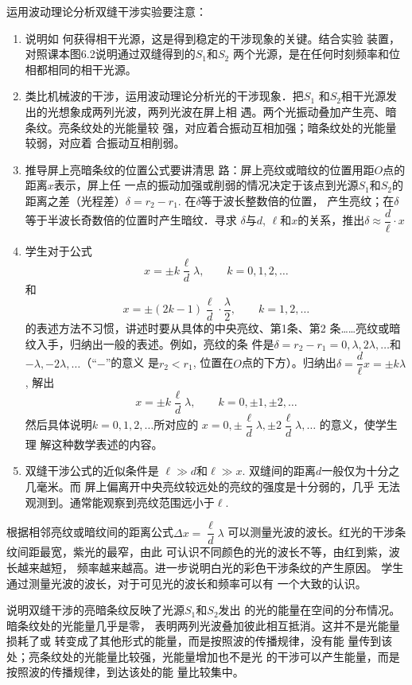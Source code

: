 运用波动理论分析双缝干涉实验要注意：
\begin{enumerate}
\item 说明如
何获得相干光源，这是得到稳定的干涉现象的关键。结合实验
装置，对照课本图6.2说明通过双缝得到的$S_1$和$S_2$
两个光源，是在任何时刻频率和位相都相同的相干光源。
\item 
类比机械波的干涉，运用波动理论分析光的干涉现象．把$S_1$
和$S_2$相干光源发出的光想象成两列光波，两列光波在屏上相
遇。两个光振动叠加产生亮、暗条纹。亮条纹处的光能量较
强，对应着合振动互相加强；暗条纹处的光能量较弱，对应着
合振动互相削弱。
\item 推导屏上亮暗条纹的位置公式要讲清思
路：屏上亮纹或暗纹的位置用距$O$点的距离$x$表示，屏上任
一点的振动加强或削弱的情况决定于该点到光源$S_1$和$S_2$的
距离之差（光程差）$\delta=r_2-r_1$. 在$\delta$等于波长整数倍的位置，
产生亮纹；在$\delta$等于半波长奇数倍的位置时产生暗纹．寻求
$\delta$与$d$, $\ell$和$x$的关系，推出$\delta\approx \dfrac{d}{\ell}\cdot x$
\item 学生对于公式
\[x=\pm k\frac{\ell }{d}\lambda, \qquad k=0,1,2,\ldots\]
和
\[x=\pm (2k-1)\frac{\ell }{d}\cdot \frac{\lambda}{2}, \qquad k=1,2,\ldots\]
的表述方法不习惯，讲述时要从具体的中央亮纹、第1条、第2
条……亮纹或暗纹入手，归纳出一般的表述。例如，亮纹的条
件是$\delta=r_2-r_1=0,\lambda,2\lambda,\ldots$和$-\lambda,-2\lambda,\ldots$（“$-$”的意义
是$r_2<r_1$, 位置在$O$点的下方）。归纳出$\delta=\dfrac{d}{\ell}x=\pm k\lambda$, 解出
\[x=\pm k\frac{\ell }{d}\lambda, \qquad k=0,\pm 1,\pm 2,\ldots\]
然后具体说明$k=0,1,
2,\ldots$所对应的
$x=0,\pm\dfrac{\ell}{d}\lambda,\pm 2\dfrac{\ell}{d}\lambda,\ldots$
的意义，使学生理
解这种数学表述的内容。
\item 双缝干涉公式的近似条件是
$\ell\gg d$和$\ell\gg x$. 双缝间的距离$d$一般仅为十分之几毫米。而
屏上偏离开中央亮纹较远处的亮纹的强度是十分弱的，几乎
无法观测到。通常能观察到亮纹范围远小于$\ell$.
\end{enumerate}


根据相邻亮纹或暗纹间的距离公式$\Delta x=\dfrac{\ell}{d}\lambda$
可以测量光波的波长。红光的干涉条纹间距最宽，紫光的最窄，由此
可认识不同颜色的光的波长不等，由红到紫，波长越来越短，
频率越来越高。进一步说明白光的彩色干涉条纹的产生原因。
学生通过测量光波的波长，对于可见光的波长和频率可以有
一个大致的认识。

说明双缝干涉的亮暗条纹反映了光源$S_1$和$S_2$发出
的光的能量在空间的分布情况。暗条纹处的光能量几乎是零，
表明两列光波叠加彼此相互抵消。这并不是光能量损耗了或
转变成了其他形式的能量，而是按照波的传播规律，没有能
量传到该处；亮条纹处的光能量比较强，光能量增加也不是光
的干涉可以产生能量，而是按照波的传播规律，到达该处的能
量比较集中。

